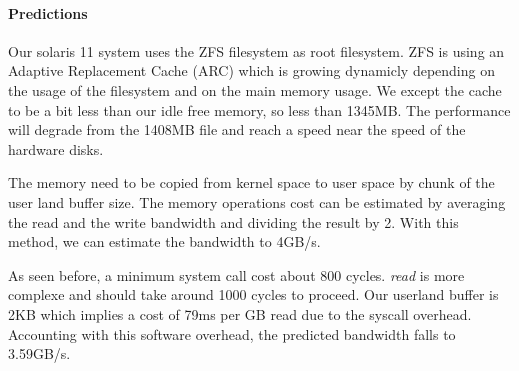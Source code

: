 \paragraph{Predictions}
Our solaris 11 system uses the ZFS filesystem as root filesystem.
ZFS is using an Adaptive Replacement Cache (ARC) which is growing dynamicly
depending on the usage of the filesystem and on the main memory usage.
We except the cache to be a bit less than our idle free memory, so less than
1345MB.
The performance will degrade from the 1408MB file and reach a speed near the
speed of the hardware disks.

The memory need to be copied from kernel space to user space by chunk of the
user land buffer size.
The memory operations cost can be estimated by averaging the read and the write
bandwidth and dividing the result by 2.
With this method, we can estimate the bandwidth to 4GB/s.

As seen before, a minimum system call cost about 800 cycles.
\emph{read} is more complexe and should take around 1000 cycles to proceed.
Our userland buffer is 2KB which implies a cost of 79ms per GB read due to the
syscall overhead.
Accounting with this software overhead, the predicted bandwidth falls to 3.59GB/s.

